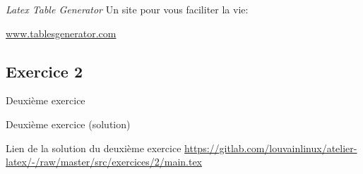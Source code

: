 \begin{frame}[fragile]{\textit{Latex Table Generator}}
  Un site pour vous faciliter la vie:
  \begin{center}
    \url{www.tablesgenerator.com}
  \end{center}
  \begin{center}
  \end{center}
\end{frame}
\subsection{Exercice 2}

\begin{frame}[fragile]{Deuxième exercice}
  \begin{center}
  \end{center}  
\end{frame}

\begin{frame}[fragile]{Deuxième exercice (solution)}
  \begin{center}
  Lien de la solution du deuxième exercice \url{https://gitlab.com/louvainlinux/atelier-latex/-/raw/master/src/exercices/2/main.tex}
  \end{center}
\end{frame}
